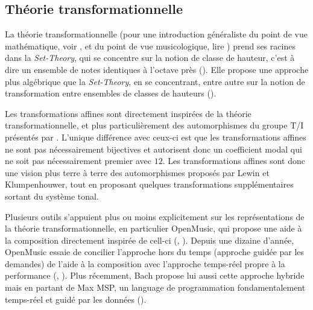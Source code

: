 \subsection{Théorie transformationnelle}
\begin{comment}
\begin{enumerate}
  \item Les transformations affines sont une généralisation 
  \begin{enumerate}
    \item des Tonnetz
    \item des k-Nets
  \end{enumerate}
  \item ces transformations sont étudiées et utilisées surtout dans un contexte d'analyse et d'aide à la composition (OpenMusic)
\end{enumerate}
\end{comment}

La théorie transformationnelle (pour une introduction généraliste du point de vue mathématique, voir \cite{andreatta2008calcul}, et du point de vue musicologique, lire \cite{andreatta2014introduction}) prend ses racines dans la \emph{Set-Theory}, qui se concentre sur la notion de classe de hauteur, c'est à dire un ensemble de notes identiques à l'octave près (\cite{forte1973structure}). Elle propose une approche plus algébrique que la \emph{Set-Theory}, en se concentrant, entre autre sur la notion de transformation entre ensembles de classes de hauteurs (\cite{lewin1987generalized}).

Les transformations affines sont directement inspirées de la théorie transformationnelle, et plus particulièrement des automorphismes du groupe T/I présentés par \textcite{lewin1990klumpenhouwer}. L'unique différence avec ceux-ci est que les transformations affines ne sont pas nécessairement bijectives et autorisent donc un coefficient modal qui ne soit pas nécessairement premier avec $12$. Les transformations affines sont donc une vision plus terre à terre des automorphismes proposés par Lewin et Klumpenhouwer, tout en proposant quelques transformations supplémentaires sortant du système tonal.

Plusieurs outils s'appuient plus ou moins explicitement sur les représentations de la théorie transformationnelle, en particulier OpenMusic, qui propose une aide à la composition directement inspirée de cell-ci (\cite{andreatta2003implementing}, \cite{andreatta2003formalisation}). Depuis une dizaine d'année, OpenMusic essaie de concilier l'approche hors du temps (approche guidée par les demandes) de l'aide à la composition avec l'approche temps-réel propre à la performance (\cite{bresson2014reactive}, \cite{bresson2017next}). Plus récemment, Bach propose lui aussi cette approche hybride mais en partant de Max MSP, un language de programmation fondamentalement temps-réel et guidé par les données (\cite{agostini2021programming}).

